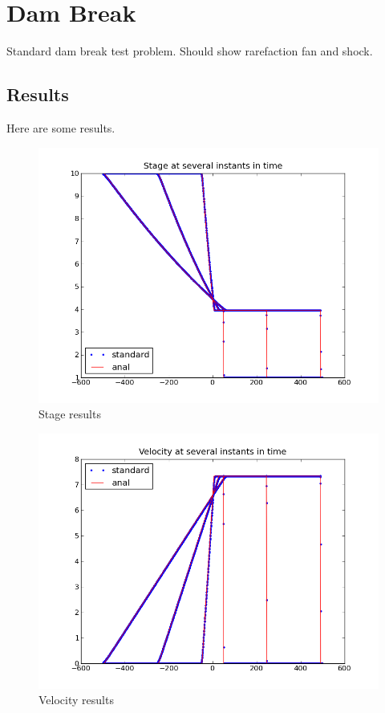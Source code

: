 
\section{Dam Break}

Standard dam break test problem. Should show rarefaction fan and shock. 

\subsection{Results}


Here are some results.

\begin{figure}
\includegraphics{stage_plot.png}
\caption{Stage results}
\end{figure}


\begin{figure}
\includegraphics{xvel_plot.png}
\caption{Velocity results}
\end{figure}


\endinput
